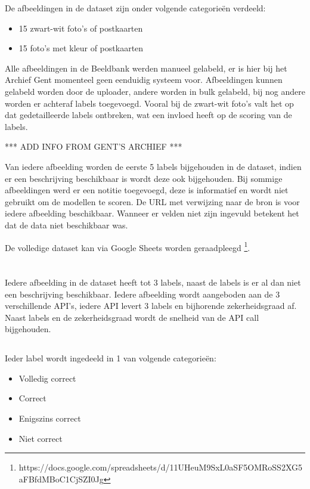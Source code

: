 De afbeeldingen in de dataset zijn onder volgende categorieën verdeeld:
\begin{itemize}
    \item 15 zwart-wit foto's of postkaarten
    \item 15 foto's met kleur of postkaarten
\end{itemize}

Alle afbeeldingen in de Beeldbank werden manueel gelabeld, er is hier bij het Archief Gent momenteel geen eenduidig systeem voor. Afbeeldingen kunnen gelabeld worden door de uploader, andere worden in bulk gelabeld, bij nog andere worden er achteraf labels toegevoegd. Vooral bij de zwart-wit foto's valt het op dat gedetailleerde labels ontbreken, wat een invloed heeft op de scoring van de labels.

*** ADD INFO FROM GENT'S ARCHIEF ***

Van iedere afbeelding worden de eerste 5 labels bijgehouden in de dataset, indien er een beschrijving beschikbaar is wordt deze ook bijgehouden. Bij sommige afbeeldingen werd er een notitie toegevoegd, deze is informatief en wordt niet gebruikt om de modellen te scoren. De URL met verwijzing naar de bron is voor iedere afbeelding beschikbaar. Wanneer er velden niet zijn ingevuld betekent het dat de data niet beschikbaar was. 

De volledige dataset kan via Google Sheets worden geraadpleegd \footnote{https://docs.google.com/spreadsheets/d/11UHeuM9SxL0aSF5OMRoSS2XG5aFBfdMBoC1CjSZI0Jg}.

\section{}
\label{sec:scoren-van-computer-vision}
Iedere afbeelding in de dataset heeft tot 3 labels, naast de labels is er al dan niet een beschrijving beschikbaar. Iedere afbeelding wordt aangeboden aan de 3 verschillende API's, iedere API levert 3 labels en bijhorende zekerheidsgraad af. Naast labels en de zekerheidsgraad wordt de snelheid van de API call bijgehouden.

\subsection{}
\label{sec:scoren-van-labels}
Ieder label wordt ingedeeld in 1 van volgende categorieën:
\begin{itemize}
    \item Volledig correct
    \item Correct
    \item Enigszins correct
    \item Niet correct
\end{itemize}

